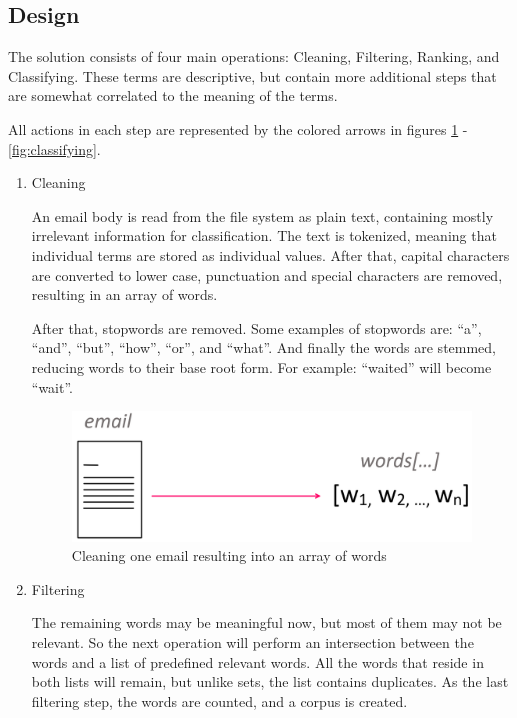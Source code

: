 \documentclass[journal]{IEEEtran}
\begin{document}
\subsection{Design}
\label{subsec:design}

The solution consists of four main operations: Cleaning, Filtering, Ranking, 
and Classifying. These terms are descriptive, but contain more additional 
steps that are somewhat correlated to the meaning of the terms.

All actions in each step are represented by the colored arrows in figures 
\ref{fig:cleaning} - \ref{fig:classifying}.

\begin{enumerate}
    \item Cleaning

    An email body is read from the file system as plain text, containing mostly
     irrelevant information for classification. The text is tokenized, meaning 
    that individual terms are stored as individual values. After that, capital 
    characters are converted to lower case, punctuation and special characters 
    are removed, resulting in an array of words.
    
    After that, stopwords are removed. Some examples of stopwords are: ``a'', 
    ``and'', ``but'', ``how'', ``or'', and ``what''. And finally the words are 
    stemmed, reducing words to their base root form. For example: ``waited'' 
    will become ``wait''.
    
    \begin{figure}[ht!]
        \centering
        \includegraphics[width=.6\linewidth]{res/cleaning}
        \caption{Cleaning one email resulting into an array of words}
        \label{fig:cleaning}
    \end{figure}

    \item Filtering

    The remaining words may be meaningful now, but most of them may not be 
    relevant. So the next operation will perform an intersection between the 
    words and a list of predefined relevant words. All the words that reside 
    in both lists will remain, but unlike sets, the list contains duplicates.
    As the last filtering step, the words are counted, and a corpus is created.


\end{enumerate}
\end{document}

